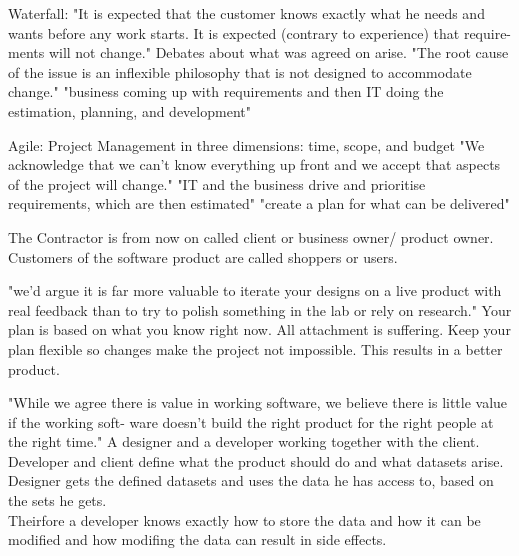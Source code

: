 Waterfall:
"It is expected that the customer knows exactly what he needs and wants before any work starts. It is expected (contrary to experience) that require- ments will not change." Debates about what was agreed on arise. "The root cause of the issue is an inflexible philosophy that is not designed to accommodate change." \citep{ratcliffe2011agile:30}
"business coming up with requirements and then IT doing the estimation, planning, and development"

Agile:
Project Management in three dimensions: time, scope, and budget
"We acknowledge that we can’t know everything up front and we accept that aspects of the project will change." 
"IT and the business drive and prioritise requirements, which are then estimated" "create a plan for what can be delivered"
\citep{ratcliffe2011agile:30-31}

The Contractor is from now on called client or business owner/ product owner.
Customers of the software product are called shoppers or users.

"we'd argue it is far more valuable to iterate your designs on a live product with real feedback than to try to polish something in the lab or rely on research." \citep{ratcliffe2011agile:32}
Your plan is based on what you know right now. All attachment is suffering. Keep your plan flexible so changes make the project not impossible. This results in a better product.

"While we agree there is value in working software, we believe there is little value if the working soft- ware doesn’t build the right product for the right people at the right time." \citep{ratcliffe2011agile:33}
A designer and a developer working together with the client. Developer and client define what the product should do and what datasets arise. Designer gets the defined datasets and uses the data he has access to, based on the sets he gets.\\
Theirfore a developer knows exactly how to store the data and how it can be modified and how modifing the data can result in side effects.



\citep{ratcliffe2011agile}